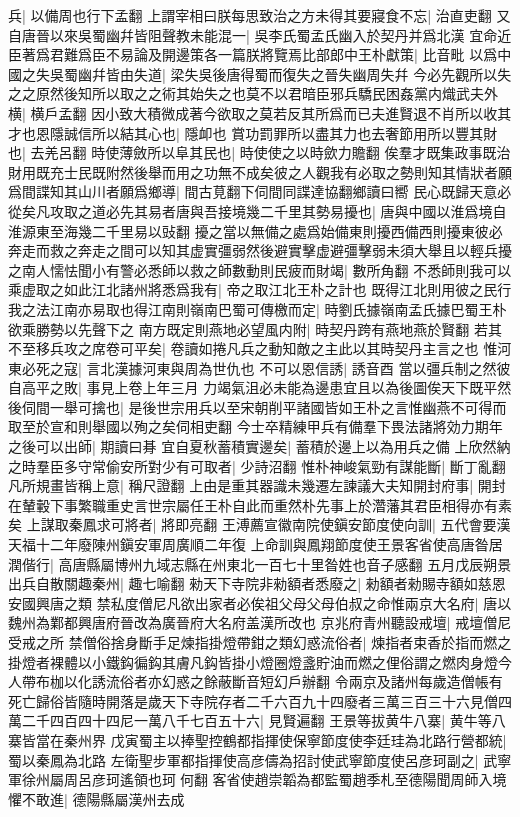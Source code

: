 兵|{
	以備周也行下孟翻}
上謂宰相曰朕每思致治之方未得其要寢食不忘|{
	治直吏翻}
又自唐晉以來吳蜀幽幷皆阻聲教未能混一|{
	吳李氏蜀孟氏幽入於契丹并爲北漢}
宜命近臣著爲君難爲臣不易論及開邊策各一篇朕將覽焉比部郎中王朴獻策|{
	比音毗}
以爲中國之失吳蜀幽幷皆由失道|{
	梁失吳後唐得蜀而復失之晉失幽周失幷}
今必先觀所以失之之原然後知所以取之之術其始失之也莫不以君暗臣邪兵驕民困姦黨内熾武夫外横|{
	横戶孟翻}
因小致大積微成著今欲取之莫若反其所爲而已夫進賢退不肖所以收其才也恩隱誠信所以結其心也|{
	隱卹也}
賞功罰罪所以盡其力也去奢節用所以豐其財也|{
	去羌呂翻}
時使薄斂所以阜其民也|{
	時使使之以時歛力贍翻}
俟羣才既集政事既治財用既充士民既附然後舉而用之功無不成矣彼之人觀我有必取之勢則知其情狀者願爲間諜知其山川者願爲鄉導|{
	間古莧翻下伺間同諜達協翻鄉讀曰嚮}
民心既歸天意必從矣凡攻取之道必先其易者唐與吾接境幾二千里其勢易擾也|{
	唐與中國以淮爲境自淮源東至海幾二千里易以䜴翻}
擾之當以無備之處爲始備東則擾西備西則擾東彼必奔走而救之奔走之間可以知其虚實彊弱然後避實擊虚避彊擊弱未須大舉且以輕兵擾之南人懦怯聞小有警必悉師以救之師數動則民疲而財竭|{
	數所角翻}
不悉師則我可以乘虚取之如此江北諸州將悉爲我有|{
	帝之取江北王朴之計也}
既得江北則用彼之民行我之法江南亦易取也得江南則嶺南巴蜀可傳檄而定|{
	時劉氏據嶺南孟氏據巴蜀王朴欲乘勝勢以先聲下之}
南方既定則燕地必望風内附|{
	時契丹跨有燕地燕於賢翻}
若其不至移兵攻之席卷可平矣|{
	卷讀如捲凡兵之動知敵之主此以其時契丹主言之也}
惟河東必死之寇|{
	言北漢據河東與周為世仇也}
不可以恩信誘|{
	誘音酉}
當以彊兵制之然彼自高平之敗|{
	事見上卷上年三月}
力竭氣沮必未能為邊患宜且以為後圖俟天下既平然後伺間一舉可擒也|{
	是後世宗用兵以至宋朝削平諸國皆如王朴之言惟幽燕不可得而取至於宣和則舉國以殉之矣伺相吏翻}
今士卒精練甲兵有備羣下畏法諸將効力期年之後可以出師|{
	期讀曰朞}
宜自夏秋蓄積實邊矣|{
	蓄積於邊上以為用兵之備}
上欣然納之時羣臣多守常偷安所對少有可取者|{
	少詩沼翻}
惟朴神峻氣勁有謀能斷|{
	斷丁亂翻}
凡所規畫皆稱上意|{
	稱尺證翻}
上由是重其器識未幾遷左諫議大夫知開封府事|{
	開封在輦轂下事繁職重史言世宗屬任王朴自此而重然朴先事上於濳藩其君臣相得亦有素矣}
上謀取秦鳳求可將者|{
	將即亮翻}
王溥薦宣徽南院使鎭安節度使向訓|{
	五代會要漢天福十二年廢陳州鎭安軍周廣順二年復}
上命訓與鳳翔節度使王景客省使高唐昝居潤偕行|{
	高唐縣屬博州九域志縣在州東北一百七十里昝姓也音子感翻}
五月戊辰朔景出兵自散關趣秦州|{
	趣七喻翻}
勑天下寺院非勑額者悉廢之|{
	勑額者勑賜寺額如慈恩安國興唐之類}
禁私度僧尼凡欲出家者必俟祖父母父母伯叔之命惟兩京大名府|{
	唐以魏州為鄴都興唐府晉改為廣晉府大名府盖漢所改也}
京兆府青州聽設戒壇|{
	戒壇僧尼受戒之所}
禁僧俗捨身斷手足煉指掛燈帶鉗之類幻惑流俗者|{
	煉指者束香於指而燃之掛燈者裸體以小鐵鈎徧鈎其膚凡鈎皆掛小燈圈燈盞貯油而燃之俚俗謂之燃肉身燈今人帶布枷以化誘流俗者亦幻惑之餘蔽斷音短幻戶辦翻}
令兩京及諸州每歲造僧帳有死亡歸俗皆隨時開落是歲天下寺院存者二千六百九十四廢者三萬三百三十六見僧四萬二千四百四十四尼一萬八千七百五十六|{
	見賢遍翻}
王景等拔黄牛八寨|{
	黄牛等八寨皆當在秦州界}
戊寅蜀主以捧聖控鶴都指揮使保寧節度使李廷珪為北路行營都統|{
	蜀以秦鳳為北路}
左衛聖步軍都指揮使高彦儔為招討使武寧節度使呂彦珂副之|{
	武寧軍徐州屬周呂彦珂遙領也珂何翻}
客省使趙崇韜為都監蜀趙季札至德陽聞周師入境懼不敢進|{
	德陽縣屬漢州去成}


